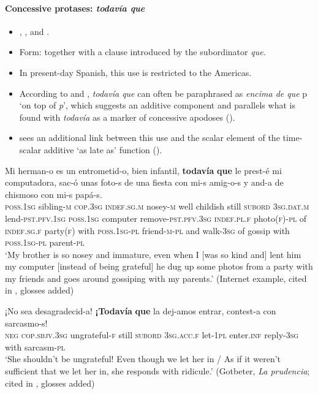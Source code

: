 \paragraph{Concessive protases: \textit{todavía que}}
\label{appendixSpanishTodaviaConcessiveAntecedent}
\begin{itemize}
	\sloppy
	\item \textcite{Bosque2016}, \textcite{Cid1999}, \textcite{Morera1999} and \textcite[§30.8o]{RAEGramatica}.	
	\item Form: together with a clause introduced by the subordinator \textit{que}.
	\item In present-day Spanish, this use is restricted to the Americas.	
	\item According to \textcite{Morera1999} and \textcite[§30.8o]{RAEGramatica}, \textit{todavía que} can often be paraphrased as \textit{encima de que} p \lq on top of \textit{p}\rq{}, which suggests an additive component and parallels what is found with \textit{todavía} as a marker of concessive apodoses ().
	\item \textcite{Bosque2016} sees an additional link between this use and the scalar element of the time-scalar additive \lq as late as\rq{ }function (). 
\end{itemize}
\begin{exe}
	\ex
	\gll Mi herman-o es un entrometid-o, bien infantil, \textbf{todavía} \textbf{que} le prest-é mi computadora, sac-ó unas foto-s de una fiesta con mi-s amig-o-s y and-a de chismoso con mi-s papá-s.\\
	\textsc{poss}.1\textsc{sg} sibling-\textsc{m} \textsc{cop}.3\textsc{sg}	\textsc{indef}.\textsc{sg}.\textsc{m} nosey-\textsc{m} well childish still \textsc{subord} 3\textsc{sg}.\textsc{dat}.\textsc{m} lend-\textsc{pst}.\textsc{pfv}.1\textsc{sg} \textsc{poss}.1\textsc{sg} computer remove-\textsc{pst}.\textsc{pfv}.3\textsc{sg} \textsc{indef}.\textsc{pl}.\textsc{f} photo(\textsc{f})-\textsc{pl} of \textsc{indef}.\textsc{sg}.\textsc{f} party(\textsc{f}) with \textsc{poss}.1\textsc{sg}-\textsc{pl} friend-\textsc{m}-\textsc{pl} and walk-3\textsc{sg} of gossip with \textsc{poss}.1\textsc{sg}-\textsc{pl} parent-\textsc{pl}\\
	\glt \lq My brother is so nosey and immature, even when I [was so kind and] lent him my computer [instead of being grateful] he dug up some photos from a party with my friends and goes around gossiping with my parents.' (Internet example, cited in \cite[206]{Bosque2016}, glosses added)

	\ex
	\gll ¡No sea desagradecid-a! \textbf{¡Todavía} \textbf{que} la dej-amos entrar, contest-a con sarcasmo-s!\\
	\phantom{!}\textsc{neg} \textsc{cop}.\textsc{sbjv}.3\textsc{sg} ungrateful-\textsc{f} still \textsc{subord} 3\textsc{sg}.\textsc{acc}.\textsc{f} let-1\textsc{pl} enter.\textsc{inf} reply-3\textsc{sg} with sarcasm-\textsc{pl}\\
	\glt \lq She shouldn't be ungrateful! Even though we let her in / As if it weren't sufficient that we let her in, she responds with ridicule.' (Gotbeter, \textit{La prudencia}; cited in \cite[206]{Bosque2016}, glosses added)
\end{exe}
